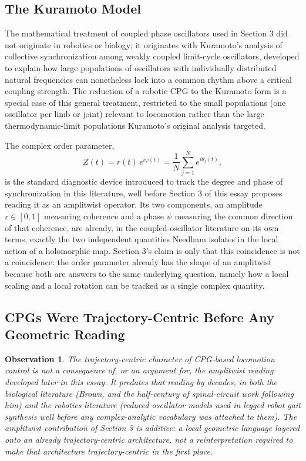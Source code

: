 \documentclass[12pt]{article}
\newtheorem{observation}{Observation}
\begin{document}
\subsection{The Kuramoto Model}

The mathematical treatment of coupled phase oscillators used in Section 3 did not originate in robotics or biology; it originates with Kuramoto's analysis of collective synchronization among weakly coupled limit-cycle oscillators, developed to explain how large populations of oscillators with individually distributed natural frequencies can nonetheless lock into a common rhythm above a critical coupling strength. The reduction of a robotic CPG to the Kuramoto form is a special case of this general treatment, restricted to the small populations (one oscillator per limb or joint) relevant to locomotion rather than the large thermodynamic-limit populations Kuramoto's original analysis targeted.

The complex order parameter,
\[
Z(t) = r(t)\, e^{i\psi(t)} = \frac{1}{N}\sum_{j=1}^{N} e^{i\theta_j(t)},
\]
is the standard diagnostic device introduced to track the degree and phase of synchronization in this literature, well before Section 3 of this essay proposes reading it as an amplitwist operator. Its two components, an amplitude $r \in [0,1]$ measuring coherence and a phase $\psi$ measuring the common direction of that coherence, are already, in the coupled-oscillator literature on its own terms, exactly the two independent quantities Needham isolates in the local action of a holomorphic map. Section 3's claim is only that this coincidence is not a coincidence: the order parameter already has the shape of an amplitwist because both are answers to the same underlying question, namely how a local scaling and a local rotation can be tracked as a single complex quantity.

\subsection{CPGs Were Trajectory-Centric Before Any Geometric Reading}

\begin{observation}
The trajectory-centric character of CPG-based locomotion control is not a consequence of, or an argument for, the amplitwist reading developed later in this essay. It predates that reading by decades, in both the biological literature (Brown, and the half-century of spinal-circuit work following him) and the robotics literature (reduced oscillator models used in legged robot gait synthesis well before any complex-analytic vocabulary was attached to them). The amplitwist contribution of Section 3 is additive: a local geometric language layered onto an already trajectory-centric architecture, not a reinterpretation required to make that architecture trajectory-centric in the first place.
\end{observation}
\end{document}
